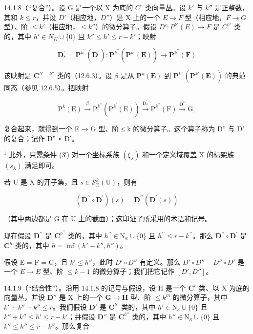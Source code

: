 14.1.8（“复合”）。设 G 是一个以 X 为底的 \(C^{r}\) 类向量丛。设 \(k'\) 与 \(k''\) 是正整数，其和 \(k \leqslant r\)，并设 \(D'\)（相应地，\(D''\)）是 X 上的一个 \(E \to F\) 型（相应地，\(F \to G\) 型）、阶 \(\leqslant k'\)（相应地，\(\leqslant k''\)）的微分算子。假设 \(D': P^{k'}(E) \to F\) 是 \(C^{h'}\) 类的，其中 \(h' \in N_{K} \cup \{0\}\) 且 \(k'' \leqslant h' \leqslant r - k'\)；映射

\[
\mathbf {D} _ {*} ^ {\prime} = \mathbf {P} ^ {k ^ {\prime \prime}} (\mathbf {D} ^ {\prime}) \colon \mathbf {P} ^ {k ^ {\prime \prime}} (\mathbf {P} ^ {k ^ {\prime}} (\mathbf {E})) \rightarrow \mathbf {P} ^ {k ^ {\prime \prime}} (\mathbf {F})
\]

该映射是 \(\mathbf{C}^{h'-k''}\) 类的（12.6.3）。设 \(\beta\) 是从 \(\mathbf{P}^{k}(\mathbf{E})\) 到 \(\mathbf{P}^{k''}(\mathbf{P}^{k'}(\mathbf{E}))\) 的典范同态（参见 12.6.5）。把映射

\[
\mathrm{P} ^ {k} (\mathrm{E}) \xrightarrow {\beta} \mathrm{P} ^ {k ^ {\prime \prime}} (\mathrm{P} ^ {k ^ {\prime}} (\mathrm{E})) \xrightarrow {\mathrm{D} _ {*} ^ {\prime}} \mathrm{P} ^ {k ^ {\prime \prime}} (\mathrm{F}) \xrightarrow {\mathrm{D} ^ {\prime \prime}} \mathrm{G},
\]

复合起来，就得到一个 E → G 型、阶 ≤ k 的微分算子。这个算子称为 D'' 与 D' 的复合；记作 D'' ∘ D'。

\(^{1}\) 此外，只需条件 (3′) 对一个坐标系族 \((\xi_{\lambda})\) 和一个定义域覆盖 X 的标架族 \((s_{\lambda})\) 满足即可。

若 U 是 X 的开子集，且 \(s \in \mathcal{S}_{\mathrm{E}}^{k}(\mathrm{U})\)，则有

\[
(\mathbf {D} ^ {\prime \prime} \circ \mathbf {D} ^ {\prime}) (s) = \mathbf {D} ^ {\prime \prime} (\mathbf {D} ^ {\prime} (s))
\]

（其中两边都是 G 在 U 上的截面）；这印证了所采用的术语和记号。

现在假设 \(\mathbf{D}^{\prime \prime}\) 是 \(\mathbf{C}^{h^{\prime \prime}}\) 类的，其中 \(h^{\prime \prime} \in \mathrm{N}_{\mathbb{K}} \cup \{0\}\) 且 \(h^{\prime \prime} \leqslant r-k^{\prime\prime}\)。那么 \(\mathbf{D}^{\prime \prime} \circ \mathbf{D}^{\prime}\) 是 \(\mathbf{C}^{h}\) 类的，其中 \(h=\inf(h'-k'',h'')\)。

假设 E = F = G，且 \(k' \leqslant h''\)，此时 \(D' \circ D''\) 有定义。那么 \(D' \circ D'' - D'' \circ D'\) 是一个 \(E \to E\) 型、阶 \(\leqslant k - 1\) 的微分算子；我们把它记作 \([D', D'']\)。

14.1.9（“结合性”）。沿用 14.1.8 的记号与假设，设 H 是一个 \(\mathbf{C}^r\) 类、以 X 为底的向量丛，并设 \(\mathbf{D}''\) 是 X 上的一个 \(\mathbf{G} \to \mathbf{H}\) 型、阶 \(\leqslant k^{m}\) 的微分算子，其中 \(k' + k'' + k'' \leqslant r\)。我们假设 \(\mathbf{D}'\) 是 \(\mathbf{C}^{h'}\) 类的，其中 \(h' \in \mathrm{N}_{\kappa} \cup \{0\}\) 且 \(k'' + k'' \leqslant h' \leqslant r - k'\)；并假设 \(\mathbf{D}''\) 是 \(\mathbf{C}^{h''}\) 类的，其中 \(h'' \in \mathrm{N}_{\kappa} \cup \{0\}\) 且 \(k'' \leqslant h'' \leqslant r - k''\)。那么复合

